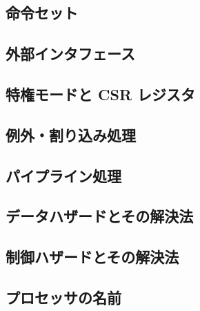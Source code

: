 \documentclass[../main.tex]{subfiles}
\begin{document}
  \subsection{命令セット}
  

  \subsection{外部インタフェース}
  

  \subsection{特権モードと CSR レジスタ}
  

  \subsection{例外・割り込み処理}
  

  \subsection{パイプライン処理}
  

  \subsection{データハザードとその解決法}
  

  \subsection{制御ハザードとその解決法}
  

  \subsection{プロセッサの名前}
\end{document}
